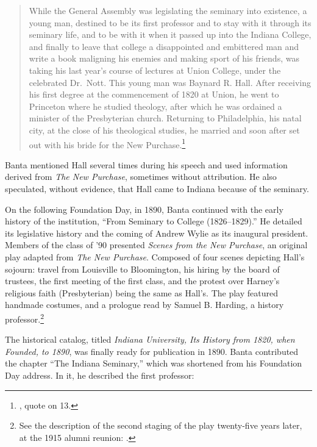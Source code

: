 \documentclass[
  american,
  letterpaper,
]{scrreprt}
\begin{document}
\begin{quote}
While the General Assembly was legislating the seminary into existence,
a young man, destined to be its first professor and to stay with it
through its seminary life, and to be with it when it passed up into the
Indiana College, and finally to leave that college a disappointed and
embittered man and write a book maligning his enemies and making sport
of his friends, was taking his last year's course of lectures at Union
College, under the celebrated Dr.~Nott. This young man was Baynard R.
Hall. After receiving his first degree at the commencement of 1820 at
Union, he went to Princeton where he studied theology, after which he
was ordained a minister of the Presbyterian church. Returning to
Philadelphia, his natal city, at the close of his theological studies,
he married and soon after set out with his bride for the New
Purchase.\footnote{,
  quote on 13.}
\end{quote}

Banta mentioned Hall several times during his speech and used
information derived from \emph{The New Purchase}, sometimes without
attribution. He also speculated, without evidence, that Hall came to
Indiana because of the seminary.

On the following Foundation Day, in 1890, Banta continued with the early
history of the institution, ``From Seminary to College (1826--1829).''
He detailed its legislative history and the coming of Andrew Wylie as
its inaugural president. Members of the class of '90 presented
\emph{Scenes from the New Purchase}, an original play adapted from
\emph{The New Purchase}. Composed of four scenes depicting Hall's
sojourn: travel from Louisville to Bloomington, his hiring by the board
of trustees, the first meeting of the first class, and the protest over
Harney's religious faith (Presbyterian) being the same as Hall's. The
play featured handmade costumes, and a prologue read by Samuel B.
Harding, a history professor.\footnote{See the description of the second
  staging of the play twenty-five years later, at the 1915 alumni
  reunion: .}

The historical catalog, titled \emph{Indiana University, Its History
from 1820, when Founded, to 1890}, was finally ready for publication in
1890. Banta contributed the chapter ``The Indiana Seminary,'' which was
shortened from his Foundation Day address. In it, he described the first
professor:
\end{document}
